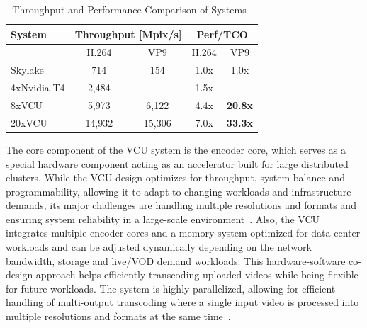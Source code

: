 \begin{table}[h!]
\centering
\caption{Throughput and Performance Comparison of Systems~\parencite{youtube_vpu}}\label{tab:youtube-vcu}
\begin{tabular}{|l|cc|cc|}
\hline
\textbf{System}      & \multicolumn{2}{c|}{\textbf{Throughput [Mpix/s]}} & \multicolumn{2}{c|}{\textbf{Perf/TCO}}    \\ \hline
            & \multicolumn{1}{c|}{H.264}       & VP9       & \multicolumn{1}{c|}{H.264} & VP9 \\ \hline
Skylake     & \multicolumn{1}{c|}{714}            & 154           & \multicolumn{1}{c|}{1.0x}      & 1.0x     \\ \hline
4xNvidia T4 & \multicolumn{1}{c|}{2,484}          & --            & \multicolumn{1}{c|}{1.5x}      & --       \\ \hline
8xVCU       & \multicolumn{1}{c|}{5,973}          & 6,122         & \multicolumn{1}{c|}{4.4x}      & \textbf{20.8x}    \\ \hline
20xVCU      & \multicolumn{1}{c|}{14,932}         & 15,306        & \multicolumn{1}{c|}{7.0x}      & \textbf{33.3x}    \\ \hline
\end{tabular}
\end{table}

The core component of the \ac{VCU} system is the encoder core, which serves as a special hardware component acting as an accelerator built for large distributed clusters. 
While the \ac{VCU} design optimizes for throughput, system balance and programmability, allowing it to adapt to changing workloads and infrastructure demands, its major challenges are handling multiple resolutions and formats and ensuring system reliability in a large-scale environment~\parencite{youtube_vpu}.
Also, the \ac{VCU} integrates multiple encoder cores and a memory system optimized for data center workloads and can be adjusted dynamically depending on the network bandwidth, storage and live/\ac{VOD} demand workloads. This hardware-software co-design approach helps efficiently transcoding uploaded videos while being flexible for future workloads. The system is highly parallelized, allowing for efficient handling of multi-output transcoding where a single input video is processed into multiple resolutions and formats at the same time~\parencite{youtube_vpu}.

